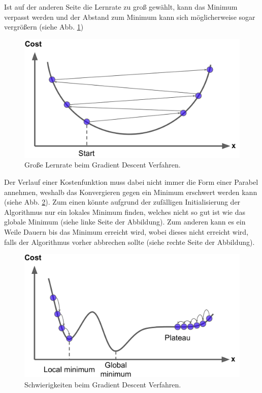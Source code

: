 \noindent
Ist auf der anderen Seite die Lernrate zu groß gewählt, kann das Minimum verpasst werden und der Abstand zum Minimum kann sich möglicherweise sogar vergrößern (siehe Abb. \ref{fig:gradient_descent3})
\begin{figure}[hbt]
	\centering
	\includegraphics[scale=0.2]{Bilder/gradient_descent3}
	\caption{Große Lernrate beim Gradient Descent Verfahren. \cite{aurelien:2017}} 
	\label{fig:gradient_descent3} 
\end{figure}

\noindent
Der Verlauf einer Kostenfunktion muss dabei nicht immer die Form einer Parabel annehmen, weshalb das Konvergieren gegen ein Minimum erschwert werden kann (siehe Abb. \ref{fig:gradient_descent4}). Zum einen könnte aufgrund der zufälligen Initialisierung der Algorithmus nur ein lokales Minimum finden, welches nicht so gut ist wie das globale Minimum (siehe linke Seite der Abbildung). Zum anderen kann es ein Weile Dauern bis das Minimum erreicht wird, wobei dieses nicht erreicht wird, falls der Algorithmus vorher abbrechen sollte (siehe rechte Seite der Abbildung).
\begin{figure}[hbt]
	\centering
	\includegraphics[scale=0.2]{Bilder/gradient_descent4}
	\caption{Schwierigkeiten beim Gradient Descent Verfahren. \cite{aurelien:2017}} 
	\label{fig:gradient_descent4} 
\end{figure}

